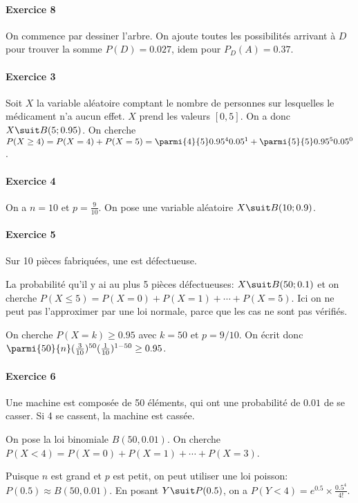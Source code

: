\documentclass[10pt,a4paper,french]{article}
\begin{document}
\paragraph{Exercice 8}
On commence par dessiner l'arbre. On ajoute toutes les possibilités arrivant à $D$ pour trouver la somme $P(D)=0.027$, idem pour $P_D(A)=0.37$.

\paragraph{Exercice 3}
Soit $X$ la variable aléatoire comptant le nombre de personnes sur lesquelles le médicament n'a aucun effet. $X$ prend les valeurs $[0, 5]$. On a donc $X \suit B(5; 0.95)$. On cherche $P(X \geq 4) = P(X = 4) + P(X = 5) = \parmi{4}{5} 0.95^4 0.05^1 + \parmi{5}{5} 0.95^5 0.05^0$.

\paragraph{Exercice 4}
On a $n = 10$ et $p = \frac{9}{10}$. On pose une variable aléatoire $X \suit B(10; 0.9)$.

\paragraph{Exercice 5}
Sur 10 pièces fabriquées, une est défectueuse.

La probabilité qu'il y ai au plus 5 pièces défectueuses: $X \suit B(50; 0.1)$ et on cherche $P(X \leq 5) = P(X=0) + P(X=1) + \cdots + P(X=5)$. Ici on ne peut pas l'approximer par une loi normale, parce que les cas ne sont pas vérifiés.

On cherche $P(X = k) \geq 0.95$ avec $k = 50$ et $p=9/10$. On écrit donc $\parmi{50}{n} (\frac{3}{10})^{50} (\frac{1}{10})^{1-50} \geq 0.95$.

\paragraph{Exercice 6}
Une machine est composée de 50 éléments, qui ont une probabilité de $0.01$ de se casser. Si 4 se cassent, la machine est cassée.

On pose la loi binomiale $B(50, 0.01)$. On cherche $P(X < 4)=P(X=0) + P(X=1) + \cdots + P(X=3)$.

Puisque $n$ est grand et $p$ est petit, on peut utiliser une loi poisson: $P(0.5) \approx B(50, 0.01)$. En posant $Y \suit P(0.5)$, on a $P(Y < 4) = e^{0.5} \times \frac{0.5^4}{4!}$.
\end{document}
